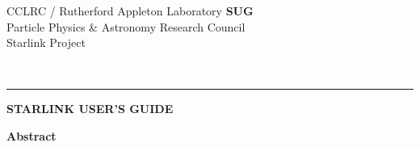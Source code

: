 \thispagestyle{empty}

\begin{latexonly}
   {\small CCLRC / {\sc Rutherford Appleton Laboratory} \hfill {\bf SUG}}\\
   {Particle Physics \& Astronomy Research Council}\\
   {Starlink Project\\}
   \begin{flushright}
   \stardocauthors\\
   \stardocdate
   \end{flushright}
   \vspace{-4mm}
   \rule{\textwidth}{0.5mm}
   \vspace{5mm}
   \begin{center}
   {\LARGE\bf  STARLINK USER'S GUIDE}
   \end{center}
   \vspace{5mm}

   \vspace{10mm}
   \begin{center}
      {\Large\bf Abstract}
   \end{center}
\end{latexonly}

